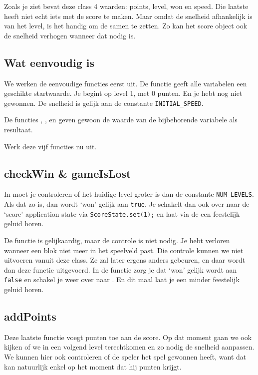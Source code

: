 Zoals je ziet bevat deze class 4 waarden: points, level, won en speed. Die laatste heeft niet echt iets met de score te maken. Maar omdat de snelheid afhankelijk is van het level, is het handig om de samen te zetten. Zo kan het score object ook de snelheid verhogen wanneer dat nodig is.

\subsection{Wat eenvoudig is}
We werken de eenvoudige functies eerst uit. De  functie geeft alle variabelen een geschikte startwaarde. Je begint op level 1, met 0 punten. En je hebt nog niet gewonnen. De snelheid is gelijk aan de constante \verb|INITIAL_SPEED|.

De functies , ,  en  geven gewoon de waarde van de bijbehorende variabele als resultaat.

Werk deze vijf functies nu uit.

\subsection{checkWin \& gameIsLost}
In  moet je controleren of het huidige level groter is dan de constante \verb|NUM_LEVELS|. Als dat zo is, dan wordt `won' gelijk aan \verb|true|. Je schakelt dan ook over naar de `score' application state via \verb|ScoreState.set(1);| en laat via de  een feestelijk geluid horen.

De functie  is gelijkaardig, maar de controle is niet nodig. Je hebt verloren wanneer een blok niet meer in het speelveld past. Die controle kunnen we niet uitvoeren vanuit deze class. Ze zal later ergens anders gebeuren, en daar wordt dan deze functie uitgevoerd. In de functie zorg je dat `won' gelijk wordt aan \verb|false| en schakel je weer over naar . En dit maal laat je een minder feestelijk geluid horen.

\subsection{addPoints}
Deze laatste functie voegt punten toe aan de score. Op dat moment gaan we ook kijken of we in een volgend level terechtkomen en zo nodig de snelheid aanpassen. We kunnen hier ook controleren of de speler het spel gewonnen heeft, want dat kan natuurlijk enkel op het moment dat hij punten krijgt.

